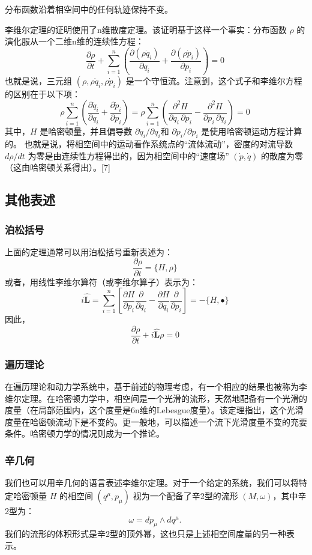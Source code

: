 分布函数沿着相空间中的任何轨迹保持不变。  

李维尔定理的证明使用了n维散度定理。该证明基于这样一个事实：分布函数 \(\rho\) 的演化服从一个二维n维的连续性方程：
\[
\frac{\partial \rho}{\partial t} + \sum_{i=1}^{n} \left( \frac{\partial (\rho \dot{q}_i)}{\partial q_i} + \frac{\partial (\rho \dot{p}_i)}{\partial p_i} \right) = 0~
\]
也就是说，三元组 \((\rho, \rho \dot{q}_i, \rho \dot{p}_i)\) 是一个守恒流。注意到，这个式子和李维尔方程的区别在于以下项：
\[
\rho \sum_{i=1}^{n} \left( \frac{\partial \dot{q}_i}{\partial q_i} + \frac{\partial \dot{p}_i}{\partial p_i} \right) = \rho \sum_{i=1}^{n} \left( \frac{\partial^2 H}{\partial q_i \, \partial p_i} - \frac{\partial^2 H}{\partial p_i \, \partial q_i} \right) = 0~
\]
其中，\( H \) 是哈密顿量，并且偏导数 \(\partial \dot{q}_i/\partial q_i\)和 \(\partial \dot{p}_i/\partial p_i\) 是使用哈密顿运动方程计算的。  
也就是说，将相空间中的运动看作系统点的“流体流动”，密度的对流导数 \(d\rho/dt\) 为零是由连续性方程得出的，因为相空间中的“速度场” \((\dot{p}, \dot{q})\) 的散度为零（这由哈密顿关系得出）。[7]
\subsection{其他表述}  
\subsubsection{泊松括号}  
上面的定理通常可以用泊松括号重新表述为：
\[
\frac{\partial \rho}{\partial t} = \{ H, \rho \}~
\]
或者，用线性李维尔算符（或李维尔算子）表示为：
\[
i \hat{\mathbf{L}} = \sum_{i=1}^{n} \left[ \frac{\partial H}{\partial p_i} \frac{\partial}{\partial q_i} - \frac{\partial H}{\partial q_i} \frac{\partial}{\partial p_i} \right] = -\{ H, \bullet \}~
\]
因此，
\[
\frac{\partial \rho}{\partial t} + i \hat{\mathbf{L}} \rho = 0~
\]
\subsubsection{遍历理论}  
在遍历理论和动力学系统中，基于前述的物理考虑，有一个相应的结果也被称为李维尔定理。在哈密顿力学中，相空间是一个光滑的流形，天然地配备有一个光滑的度量（在局部范围内，这个度量是6n维的Lebesgue度量）。该定理指出，这个光滑度量在哈密顿流动下是不变的。更一般地，可以描述一个流下光滑度量不变的充要条件。哈密顿力学的情况则成为一个推论。
\subsubsection{辛几何} 
我们也可以用辛几何的语言表述李维尔定理。对于一个给定的系统，我们可以将特定哈密顿量 \( H \) 的相空间 \( (q^\mu, p_\mu) \) 视为一个配备了辛2型的流形 \( (M, \omega) \)，其中辛2型为：
\[
\omega = dp_\mu \wedge dq^\mu.~
\]
我们的流形的体积形式是辛2型的顶外幂，这也只是上述相空间度量的另一种表示。

